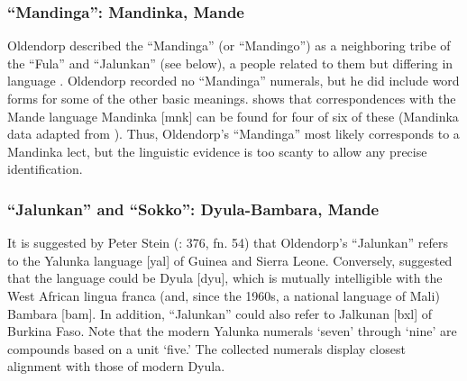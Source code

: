 \documentclass[output=paper,colorlinks,citecolor=brown]{langscibook}
\begin{document}
\subsubsection{``Mandinga'': Mandinka, Mande}

Oldendorp described the ``Mandinga'' (or ``Mandingo'') as a neighboring tribe of the ``Fula'' and ``Jalunkan'' (see below), a people related to them but differing in language \citep[376]{Oldendorp_2000}. Oldendorp recorded no ``Mandinga'' numerals, but he did include word forms for some of the other basic meanings.  shows that correspondences with the Mande language Mandinka [mnk] can be found for four of six of these (Mandinka data adapted from \cite{Peace_Corps_The_Gambia_1995}). Thus, Oldendorp’s ``Mandinga'' most likely corresponds to a Mandinka lect, but the linguistic evidence is too scanty to allow any precise identification.

\begin{table}[!ht]
\centering
\setlength{\tabcolsep}{4pt}
\caption{Oldendorp’s “Mandinga” compared with Mandinka [mnk]}
\label{tab:tab4_02}
\end{table}

\subsubsection{``Jalunkan'' and ``Sokko'': Dyula-Bambara, Mande}

It is suggested by Peter Stein (\cite{Oldendorp_2000}: 376, fn. 54) that Oldendorp’s ``Jalunkan'' refers to the Yalunka language [yal] of Guinea and Sierra Leone. Conversely, \citet[104]{Fodor_1975} suggested that the language could be Dyula [dyu], which is mutually intelligible with the West African lingua franca (and, since the 1960s, a national language of Mali) Bambara [bam]. In addition, ``Jalunkan'' could also refer to Jalkunan [bxl] of Burkina Faso. Note that the modern Yalunka numerals `seven' through `nine' are compounds based on a unit `five.' The collected numerals display closest alignment with those of modern Dyula.
\end{document}
